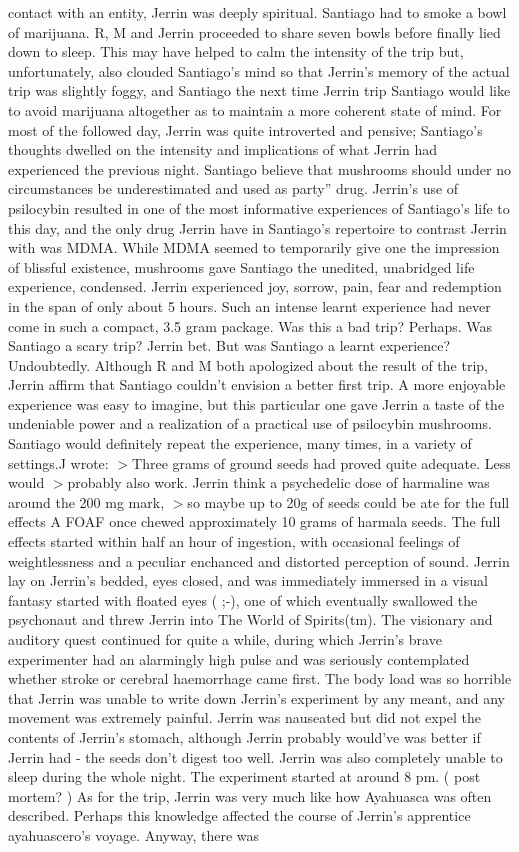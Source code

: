 \documentclass[12pt]{book}
\begin{document}
contact with an entity, Jerrin was deeply spiritual. Santiago had to smoke a bowl of marijuana. R, M and Jerrin proceeded to share seven bowls before finally lied down to sleep. This may have helped to calm the intensity of the trip but, unfortunately, also clouded Santiago's mind so that Jerrin's memory of the actual trip was slightly foggy, and Santiago the next time Jerrin trip Santiago would like to avoid marijuana altogether as to maintain a more coherent state of mind. For most of the followed day, Jerrin was quite introverted and pensive; Santiago's thoughts dwelled on the intensity and implications of what Jerrin had experienced the previous night. Santiago believe that mushrooms should under no circumstances be underestimated and used as party'' drug. Jerrin's use of psilocybin resulted in one of the most informative experiences of Santiago's life to this day, and the only drug Jerrin have in Santiago's repertoire to contrast Jerrin with was MDMA. While MDMA seemed to temporarily give one the impression of blissful existence, mushrooms gave Santiago the unedited, unabridged life experience, condensed. Jerrin experienced joy, sorrow, pain, fear and redemption in the span of only about 5 hours. Such an intense learnt experience had never come in such a compact, 3.5 gram package. Was this a bad trip? Perhaps. Was Santiago a scary trip? Jerrin bet. But was Santiago a learnt experience? Undoubtedly. Although R and M both apologized about the result of the trip, Jerrin affirm that Santiago couldn't envision a better first trip. A more enjoyable experience was easy to imagine, but this particular one gave Jerrin a taste of the undeniable power and a realization of a practical use of psilocybin mushrooms. Santiago would definitely repeat the experience, many times, in a variety of settings.J wrote: $>$Three grams of ground seeds had proved quite adequate. Less would $>$probably also work. Jerrin think a psychedelic dose of harmaline was around the 200 mg mark, $>$so maybe up to 20g of seeds could be ate for the full effects A FOAF once chewed approximately 10 grams of harmala seeds. The full effects started within half an hour of ingestion, with occasional feelings of weightlessness and a peculiar enchanced and distorted perception of sound. Jerrin lay on Jerrin's bedded, eyes closed, and was immediately immersed in a visual fantasy started with floated eyes ( ;-), one of which eventually swallowed the psychonaut and threw Jerrin into The World of Spirits(tm). The visionary and auditory quest continued for quite a while, during which Jerrin's brave experimenter had an alarmingly high pulse and was seriously contemplated whether stroke or cerebral haemorrhage came first. The body load was so horrible that Jerrin was unable to write down Jerrin's experiment by any meant, and any movement was extremely painful. Jerrin was nauseated but did not expel the contents of Jerrin's stomach, although Jerrin probably would've was better if Jerrin had - the seeds don't digest too well. Jerrin was also completely unable to sleep during the whole night. The experiment started at around 8 pm. ( post mortem? ) As for the trip, Jerrin was very much like how Ayahuasca was often described. Perhaps this knowledge affected the course of Jerrin's apprentice ayahuascero's voyage. Anyway, there was 
\end{document}
